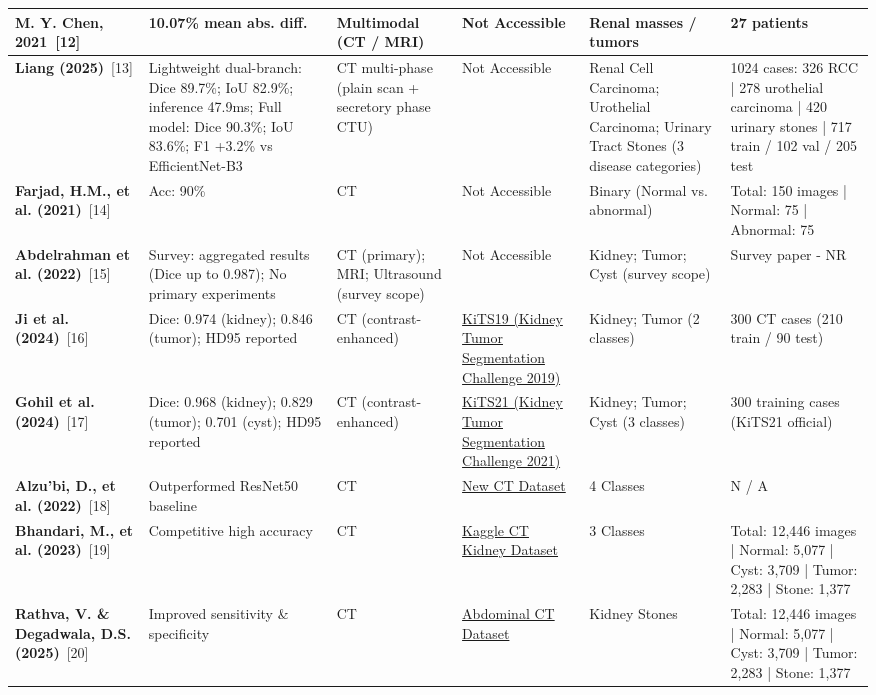 \documentclass{article}
\begin{document}
\begin{longtable}{|L{2.8cm}|L{2.5cm}|L{1.5cm}|L{3.5cm}|L{3.5cm}|L{4.5cm}|}
\hline
\textbf{M. Y. Chen, 2021}~[12] & 10.07\% mean abs. diff. & Multimodal (CT / MRI) & Not Accessible & Renal masses / tumors & 27 patients \\
\hline
\textbf{Liang (2025)}~[13] & Lightweight dual-branch: Dice 89.7\%; IoU 82.9\%; inference 47.9ms; Full model: Dice 90.3\%; IoU 83.6\%; F1 +3.2\% vs EfficientNet-B3 & CT multi-phase (plain scan + secretory phase CTU) & Not Accessible & Renal Cell Carcinoma; Urothelial Carcinoma; Urinary Tract Stones (3 disease categories) & 1024 cases: 326 RCC | 278 urothelial carcinoma | 420 urinary stones | 717 train / 102 val / 205 test \\
\hline
\textbf{Farjad, H.M., et al. (2021)}~[14] & Acc: 90\% & CT & Not Accessible & Binary (Normal vs. abnormal) & Total: 150 images | Normal: 75 | Abnormal: 75 \\
\hline
\textbf{Abdelrahman et al. (2022)}~[15] & Survey: aggregated results (Dice up to 0.987); No primary experiments & CT (primary); MRI; Ultrasound (survey scope) & Not Accessible & Kidney; Tumor; Cyst (survey scope) & Survey paper - NR \\
\hline
\textbf{Ji et al. (2024)}~[16] & Dice: 0.974 (kidney); 0.846 (tumor); HD95 reported & CT (contrast-enhanced) & \href{https://github.com/neheller/kits19/tree/master/data}{KiTS19 (Kidney Tumor Segmentation Challenge 2019)} & Kidney; Tumor (2 classes) & 300 CT cases (210 train / 90 test) \\
\hline
\textbf{Gohil et al. (2024)}~[17] & Dice: 0.968 (kidney); 0.829 (tumor); 0.701 (cyst); HD95 reported & CT (contrast-enhanced) & \href{https://github.com/neheller/kits21/tree/master/kits21/data}{KiTS21 (Kidney Tumor Segmentation Challenge 2021)} & Kidney; Tumor; Cyst (3 classes) & 300 training cases (KiTS21 official) \\
\hline
\textbf{Alzu'bi, D., et al. (2022)}~[18] & Outperformed ResNet50 baseline & CT & \href{https://github.com/DaliaAlzubi/KidneyTumor/tree/main/Dataset}{New CT Dataset} & 4 Classes & N / A \\
\hline
\textbf{Bhandari, M., et al. (2023)}~[19] & Competitive high accuracy & CT & \href{https://www.kaggle.com/datasets/nazmul0087/ct-kidney-dataset-normal-cyst-tumor-and-stone}{Kaggle CT Kidney Dataset} & 3 Classes & Total: 12,446 images | Normal: 5,077 | Cyst: 3,709 | Tumor: 2,283 | Stone: 1,377 \\
\hline
\textbf{Rathva, V. \& Degadwala, D.S. (2025)}~[20] & Improved sensitivity \& specificity & CT & \href{https://www.kaggle.com/datasets/nazmul0087/ct-kidney-dataset-normal-cyst-tumor-and-stone}{Abdominal CT Dataset} & Kidney Stones & Total: 12,446 images | Normal: 5,077 | Cyst: 3,709 | Tumor: 2,283 | Stone: 1,377 \\

\end{longtable}
\end{document}
